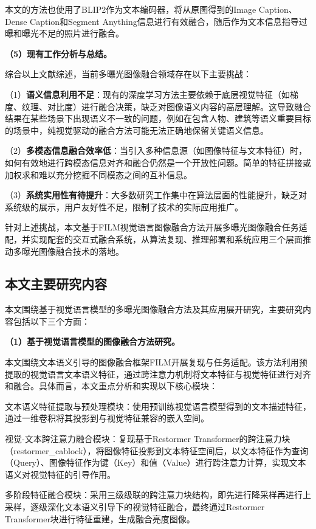 本文的方法也使用了BLIP2作为文本编码器，将从原图得到的Image Caption、Dense Caption和Segment Anything信息进行有效融合，随后作为文本信息指导过曝和曝光不足的照片进行融合。

\textbf{（5）现有工作分析与总结。}

综合以上文献综述，当前多曝光图像融合领域存在以下主要挑战：

（1）\textbf{语义信息利用不足}：现有的深度学习方法主要依赖于底层视觉特征（如梯度、纹理、对比度）进行融合决策，缺乏对图像语义内容的高层理解。这导致融合结果在某些场景下出现语义不一致的问题，例如在包含人物、建筑等语义重要目标的场景中，纯视觉驱动的融合方法可能无法正确地保留关键语义信息。

（2）\textbf{多模态信息融合效率低}：当引入多种信息源（如图像特征与文本特征）时，如何有效地进行跨模态信息对齐和融合仍然是一个开放性问题。简单的特征拼接或加权求和难以充分挖掘不同模态之间的互补信息。

（3）\textbf{系统实用性有待提升}：大多数研究工作集中在算法层面的性能提升，缺乏对系统级的展示，用户友好性不足，限制了技术的实际应用推广。

针对上述挑战，本文基于FILM视觉语言图像融合方法开展多曝光图像融合任务适配，并实现配套的交互式融合系统，从算法复现、推理部署和系统应用三个层面推动多曝光图像融合技术的落地。

\subsection{本文主要研究内容}\label{sec:content}

本文围绕基于视觉语言模型的多曝光图像融合方法及其应用展开研究，主要研究内容包括以下三个方面：

\textbf{（1）基于视觉语言模型的图像融合方法研究。}

本文围绕文本语义引导的图像融合框架FILM开展复现与任务适配。该方法利用预提取的视觉语言文本语义特征，通过跨注意力机制将文本特征与视觉特征进行对齐和融合。具体而言，本文重点分析和实现以下核心模块：

文本语义特征提取与预处理模块：使用预训练视觉语言模型得到的文本描述特征，通过一维卷积将其投影到与视觉特征兼容的嵌入空间。

视觉-文本跨注意力融合模块：复现基于Restormer Transformer的跨注意力块（restormer\_cablock），将图像特征投影到文本特征空间后，以文本特征作为查询（Query）、图像特征作为键（Key）和值（Value）进行跨注意力计算，实现文本语义对视觉特征的引导作用。

多阶段特征融合模块：采用三级级联的跨注意力块结构，即先进行降采样再进行上采样，逐级深化文本语义引导下的视觉特征融合，最终通过Restormer Transformer块进行特征重建，生成融合亮度图像。

